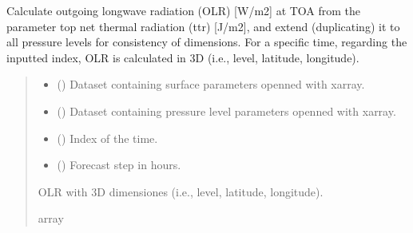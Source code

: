 \documentclass[a4paper,11pt,english]{sphinxmanual}
\begin{document}
\label{\detokenize{modules:module-envlib.processing_surf_vars}}

\begin{fulllineitems}
\label{\detokenize{modules:envlib.processing_surf_vars.extend_olr_pl_4d}}
\pysigstartsignatures
{}
\pysigstopsignatures
\sphinxAtStartPar
Calculate outgoing longwave radiation (OLR) {[}W/m2{]} at TOA from the parameter top net thermal radiation (ttr)
{[}J/m2{]}, and extend (duplicating) it to all pressure levels for consistency of dimensions. For a specific time, 
regarding the inputted index, OLR is calculated in 3D (i.e., level, latitude, longitude).
\begin{quote}\begin{description}
\begin{itemize}
\item {} 
\sphinxAtStartPar
{} () \textendash{} Dataset containing surface parameters openned with xarray.

\item {} 
\sphinxAtStartPar
{} () \textendash{} Dataset containing pressure level parameters openned with xarray.

\item {} 
\sphinxAtStartPar
{} () \textendash{} Index of the time.

\item {} 
\sphinxAtStartPar
{} () \textendash{} Forecast step in hours.

\end{itemize}

\sphinxAtStartPar
OLR with 3D dimensiones (i.e., level, latitude, longitude).

\sphinxAtStartPar
array

\end{description}\end{quote}

\end{fulllineitems}
\end{document}
